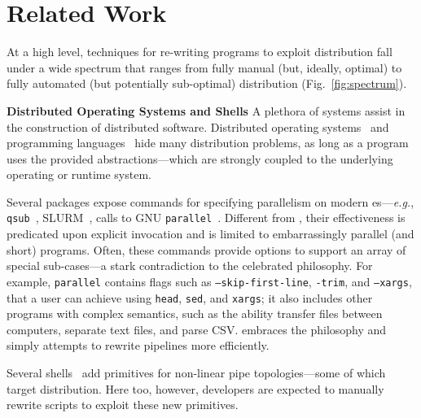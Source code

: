 \documentclass[sigplan,10pt,review,anonymous]{acmart}
\newcommand{\eg}{{\em e.g.}, }
\newcommand{\heading}[1]{\vspace{4pt}\noindent\textbf{#1}\enspace}
\newcommand{\ttt}[1]{\texttt{\small #1}}
\begin{document}



\section{Related Work}
\label{related}

At a high level, techniques for re-writing programs to exploit distribution fall under a wide spectrum that ranges from
  fully manual (but, ideally, optimal) to 
  fully automated (but potentially sub-optimal) distribution   (Fig.~\ref{fig:spectrum}).

\heading{Distributed Operating Systems and Shells}
A plethora of systems assist in the construction of distributed software.
Distributed operating systems~\cite{ousterhout1988sprite, mullender1990amoeba, pike1990plan9, barak1998mosix} and programming languages~\cite{erlang:96, acute:05, mace:07, cloudhaskell:11}
hide many distribution problems, as long as a program uses the provided abstractions---which are strongly coupled to the underlying operating or runtime system.

Several packages expose commands for specifying parallelism on modern \unix{}es---\eg \ttt{qsub}~\cite{gentzsch2001sun}, \textsc{SLURM}~\cite{yoo2003slurm}, calls to \textsc{GNU} \ttt{parallel}~\cite{Tange2011a}. %
Different from \sys, their effectiveness is predicated upon explicit invocation and is limited to embarrassingly parallel (and short) programs.
Often, these commands provide options to support an array of special sub-cases---a stark contradiction to the celebrated \unix philosophy.
For example, \ttt{parallel} contains flags such as \ttt{--skip-first-line}, \ttt{-trim}, and \ttt{--xargs}, that a \unix user can achieve using \ttt{head}, \ttt{sed}, and \ttt{xargs}; it also includes other programs with complex semantics, such as the ability transfer files between computers, separate text files, and parse CSV.
\sys embraces the \unix philosophy and simply attempts to rewrite pipelines more efficiently.

Several shells~\cite{duff1990rc, mcdonald1988support, dagsh:17} add primitives for non-linear pipe topologies---some of which target distribution.
Here too, however, developers are expected to manually rewrite scripts to exploit these new primitives.
\end{document}
